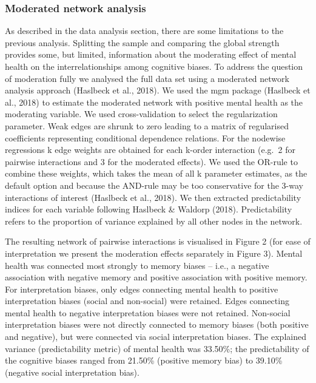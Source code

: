 \documentclass[man,floatsintext]{apa6}
\begin{document}
\hypertarget{moderated-network-analysis}{%
\subsubsection{Moderated network analysis}\label{moderated-network-analysis}}

As described in the data analysis section, there are some limitations to the previous analysis. Splitting the sample and comparing the global strength provides some, but limited, information about the moderating effect of mental health on the interrelationships among cognitive biases. To address the question of moderation fully we analysed the full data set using a moderated network analysis approach (Haslbeck et al., 2018). We used the mgm package (Haslbeck et al., 2018) to estimate the moderated network with positive mental health as the moderating variable. We used cross-validation to select the regularization parameter. Weak edges are shrunk to zero leading to a matrix of regularised coefficients representing conditional dependence relations. For the nodewise regressions k edge weights are obtained for each k-order interaction (e.g.~2 for pairwise interactions and 3 for the moderated effects). We used the OR-rule to combine these weights, which takes the mean of all k parameter estimates, as the default option and because the AND-rule may be too conservative for the 3-way interactions of interest (Haslbeck et al., 2018). We then extracted predictability indices for each variable following Haslbeck \& Waldorp (2018). Predictability refers to the proportion of variance explained by all other nodes in the network.

The resulting network of pairwise interactions is visualised in Figure 2 (for ease of interpretation we present the moderation effects separately in Figure 3). Mental health was connected most strongly to memory biases -- i.e., a negative association with negative memory and positive association with positive memory. For interpretation biases, only edges connecting mental health to positive interpretation biases (social and non-social) were retained. Edges connecting mental health to negative interpretation biases were not retained. Non-social interpretation biases were not directly connected to memory biases (both positive and negative), but were connected via social interpretation biases. The explained variance (predictability metric) of mental health was 33.50\%; the predictability of the cognitive biases ranged from 21.50\% (positive memory bias) to 39.10\% (negative social interpretation bias).
\end{document}
